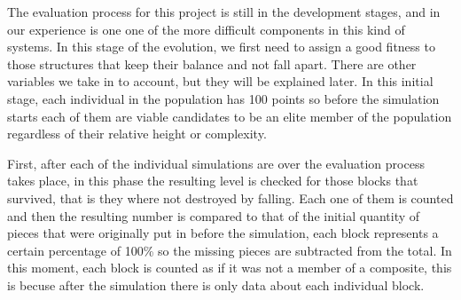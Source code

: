 \documentclass[conference]{IEEEtran}
\begin{document}
    The evaluation process for this project is still in the development stages,
    and in our experience is one one of the more difficult components in this
    kind of systems. In this stage of the evolution, we first need to assign a
    good fitness to those structures that keep their balance and not fall apart.
    There are other variables we take in to account, but they will be explained
    later. In this initial stage, each individual in the population has 100
    points so before the simulation starts each of them are viable candidates to
    be an elite member of the population regardless of their relative height or
    complexity.
    
    First, after each of the individual simulations are over the evaluation process
    takes place, in this phase the resulting level is checked for those blocks that
    survived, that is they where not destroyed by falling. Each one
    of them is counted and then the resulting number is compared to that of the
    initial quantity of pieces that were originally put in before the simulation,
    each block represents a certain percentage of 100\% so the missing pieces 
    are subtracted from the total. In this moment, each block is counted as if 
    it was not a member of a composite, this is becuse after the simulation there is
    only data about each individual block.  
    
    
    
\end{document}
